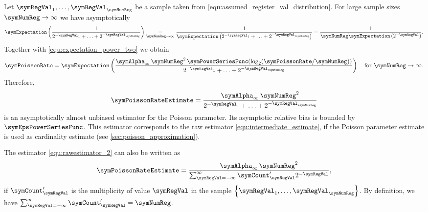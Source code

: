 \documentclass[a4paper]{scrartcl}
\begin{document}
Let $\symRegVal_1,\ldots,\symRegVal_\symNumReg$ be a sample taken from \eqref{equ:assumed_register_val_distribution}. For large sample sizes $\symNumReg\rightarrow \infty$ we have asymptotically
\begin{equation}
\symExpectation\left(
\frac{1}{2^{-\symRegVal_1}+\ldots+2^{-\symRegVal_\symNumReg}}
\right)
\underset{\symNumReg\rightarrow \infty}{=}
\frac{1}{\symExpectation
\left(2^{-\symRegVal_1}+\ldots+2^{-\symRegVal_\symNumReg}\right)}
=
\frac{1}{\symNumReg \symExpectation\left(2^{-\symRegVal}\right)}.
\end{equation}
Together with \eqref{equ:expectation_power_two} we obtain
\begin{equation}
\symPoissonRate
=
\symExpectation\left(
\frac{\symAlpha_\infty\,\symNumReg^2\,\symPowerSeriesFunc\!\left(\log_2\!\left( \symPoissonRate/\symNumReg\right)\right)}{2^{-\symRegVal_1}+\ldots+2^{-\symRegVal_\symNumReg}}
\right)
\quad
\text{for $\symNumReg\rightarrow \infty$}.
\end{equation}
Therefore, 
\begin{equation}
\label{equ:rawestimator_2}
\symPoissonRateEstimate 
= 
\frac{\symAlpha_\infty\,\symNumReg^2}{2^{-\symRegVal_1}+\ldots+2^{-\symRegVal_\symNumReg}}
\end{equation}
is an asymptotically almost unbiased estimator for the Poisson parameter. Its asymptotic relative bias is bounded by $\symEpsPowerSeriesFunc$. This estimator corresponds to the raw estimator \eqref{equ:intermediate_estimate}, if the Poisson parameter estimate is used as cardinality estimate (see \cref{sec:poisson_approximation}).

The estimator \eqref{equ:rawestimator_2} can also be written as
\begin{equation}
\label{equ:raw_estimate_with_multiplicities}
\symPoissonRateEstimate 
= 
\frac{\symAlpha_\infty\,\symNumReg^2}{\sum_{\symRegVal=-\infty}^\infty \symCount'_\symRegVal 2^{-\symRegVal}},
\end{equation}
if $\symCount'_\symRegVal$ is the multiplicity of value $\symRegVal$ in the sample $\left\lbrace \symRegVal_1,\ldots,\symRegVal_\symNumReg\right\rbrace$. 
By definition, we have $\sum_{\symRegVal=-\infty}^\infty \symCount'_\symRegVal = \symNumReg$. 
\end{document}

